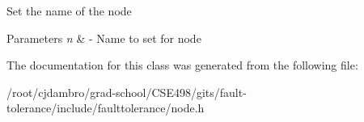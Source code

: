 Set the name of the node


\begin{DoxyParams}{Parameters}
{\em n} & -\/ Name to set for node \\
\hline
\end{DoxyParams}


The documentation for this class was generated from the following file\+:\begin{DoxyCompactItemize}
\item 
/root/cjdambro/grad-\/school/\+C\+S\+E498/gits/fault-\/tolerance/include/faulttolerance/node.\+h\end{DoxyCompactItemize}
